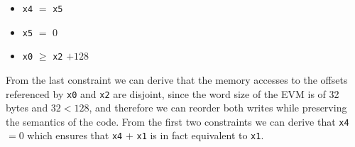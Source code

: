 \begin{itemize}
    \item \verb|x4| $=$ \verb|x5|
    \item \verb|x5| $=$ 0
    \item \verb|x0| $\ge$ \verb|x2| $+ 128$
\end{itemize}

From the last constraint we can derive that the memory accesses to the offsets
referenced by \verb|x0| and \verb|x2| are disjoint, since the word size of the EVM is of 32 bytes and 
$32 < 128$, and therefore we can reorder both writes while preserving the semantics of the code.
From the first two constraints we can derive that \verb|x4| $= 0$ which ensures that \verb|x4| $+$ 
\verb|x1| is in fact equivalent to \verb|x1|.
